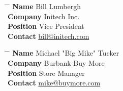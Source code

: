 \parbox {0.5\textwidth} {
    \begin{tabbing}
        \hspace{2.75cm} \= \hspace{4cm} \= \kill %
        {\bf Name} \> Bill Lumbergh \\ %
        {\bf Company} \> Initech Inc. \\ %
        {\bf Position} \> Vice President \\ %
        {\bf Contact} \> \href{mailto:bill@initech.com}{bill@initech.com} %
    \end{tabbing}
}
\hfill %
\parbox {0.5\textwidth} {
    \begin {tabbing}
        \hspace {2.75cm} \= \hspace {4cm} \= \kill %
        {\bf Name} \> Michael "Big Mike" Tucker\\ %
        {\bf Company} \> Burbank Buy More \\ %
        {\bf Position} \> Store Manager \\ %
        {\bf Contact} \> \href{mailto:mike@buymore.com}{mike@buymore.com} %
    \end{tabbing}
}
